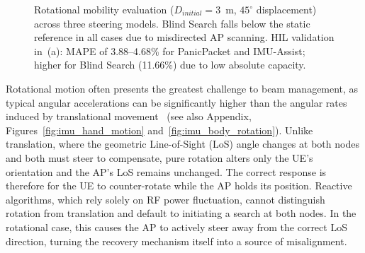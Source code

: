 \documentclass[fleqn,10pt]{wlscirep}
\newcommand{\legline}[2]{%
    \tikz[Blind Search=-0.5ex]{
        \draw[#1, #2, line width=1.5pt] (0,0) -- (0.5,0);
    }%
}
\newcommand{\legmark}[2]{%
    \tikz[Blind Search=-0.5ex]{
        \node[#2, fill=#1, draw=#1, inner sep=2pt, scale=0.8] at (0,0) {};
    }%
}
\begin{document}
\begin{figure}[ht!]
    
    
    \caption{Rotational mobility evaluation ($D_{initial} = 3$~m, $45^\circ$ displacement) across three steering models. Blind Search falls below the static reference in all cases due to misdirected AP scanning. HIL validation in~(a): MAPE of 3.88--4.68\% for PanicPacket and IMU-Assist; higher for Blind Search (11.66\%) due to low absolute capacity.}
    \label{fig:rotational_rate}
\end{figure}

Rotational motion often presents the greatest challenge to beam management, as typical angular accelerations can be significantly higher than the angular rates induced by translational movement~\cite{9391649} (see also Appendix, Figures~\ref{fig:imu_hand_motion} and~\ref{fig:imu_body_rotation}). Unlike translation, where the geometric Line-of-Sight (LoS) angle changes at both nodes and both must steer to compensate, pure rotation alters only the UE's orientation and the AP's LoS remains unchanged. The correct response is therefore for the UE to counter-rotate while the AP holds its position. Reactive algorithms, which rely solely on RF power fluctuation, cannot distinguish rotation from translation and default to initiating a search at both nodes. In the rotational case, this causes the AP to actively steer away from the correct LoS direction, turning the recovery mechanism itself into a source of misalignment.
\end{document}
